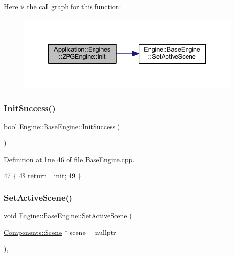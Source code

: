 Here is the call graph for this function\+:
\nopagebreak
\begin{figure}[H]
\begin{center}
\leavevmode
\includegraphics[width=327pt]{classApplication_1_1Engines_1_1ZPGEngine_a08a065a6200bf4465b71efa08f173cc5_cgraph}
\end{center}
\end{figure}
\mbox{\label{classEngine_1_1BaseEngine_a7a1c9b833049b3eb61194cab113dfe89}} 
\subsubsection{\texorpdfstring{Init\+Success()}{InitSuccess()}}
{\footnotesize\ttfamily bool Engine\+::\+Base\+Engine\+::\+Init\+Success (\begin{DoxyParamCaption}{ }\end{DoxyParamCaption})\hspace{0.3cm}{\ttfamily [inherited]}}



Definition at line 46 of file Base\+Engine.\+cpp.


\begin{DoxyCode}
47 \{
48     \textcolor{keywordflow}{return} \mbox{\hyperlink{classEngine_1_1BaseEngine_a79e265845b321c0e9822fb170c564e55}{\_init}};
49 \}
\end{DoxyCode}
\mbox{\label{classEngine_1_1BaseEngine_afc82c6a00d5a9d4714740fc5eab5db86}} 
\subsubsection{\texorpdfstring{Set\+Active\+Scene()}{SetActiveScene()}}
{\footnotesize\ttfamily void Engine\+::\+Base\+Engine\+::\+Set\+Active\+Scene (\begin{DoxyParamCaption}\item[{\mbox{\hyperlink{classEngine_1_1Components_1_1Scene}{Components\+::\+Scene}} $\ast$}]{scene = {\ttfamily nullptr} }\end{DoxyParamCaption})\hspace{0.3cm}{\ttfamily [virtual]}, {\ttfamily [inherited]}}



